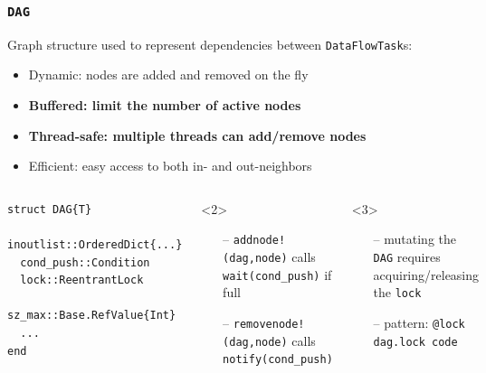 \documentclass{beamer}
\begin{document}
\begin{frame}[fragile]
\frametitle{{\texttt{DAG}}}  

Graph structure used to represent dependencies between \texttt{DataFlowTask}s:

\begin{itemize}
  \item Dynamic: nodes are added and removed on the fly
  \item \textbf<2>{Buffered: limit the number of active nodes}
  \item \textbf<3>{Thread-safe: multiple threads can add/remove nodes}
  \item Efficient: easy access to both in- and out-neighbors
\end{itemize}

\hrulefill

\begin{columns}

\begin{exampleblock}{}
\begin{verbatim}
struct DAG{T}
  inoutlist::OrderedDict{...}
  cond_push::Condition
  lock::ReentrantLock
  sz_max::Base.RefValue{Int}
  ...
end
\end{verbatim}
\end{exampleblock}


\begin{onlyenv}<2>
\begin{itemize}
  \item[--] \texttt{addnode!(dag,node)} calls
  \texttt{wait(cond_push)} if full
  \item[--] \texttt{removenode!(dag,node)} calls \texttt{notify(cond_push)}
\end{itemize}
\end{onlyenv}

\begin{onlyenv}<3>
  \begin{itemize}
    \item[--] mutating the \texttt{DAG} requires acquiring/releasing the \texttt{lock}
    \item[--] pattern: \texttt{@lock dag.lock code}
  \end{itemize}
  \end{onlyenv}


\end{columns}

\end{frame}
\end{document}
